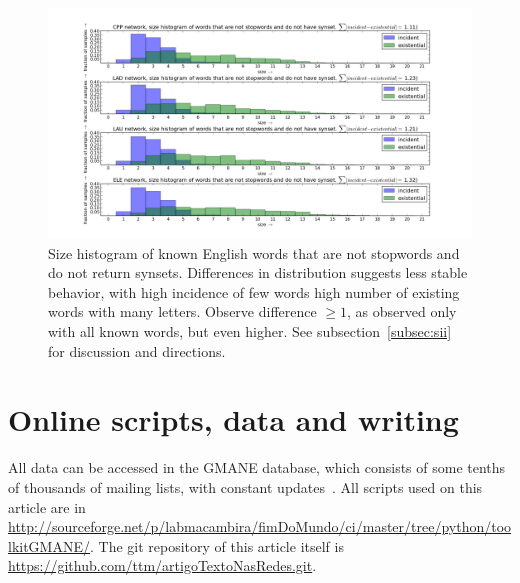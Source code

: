 \documentclass[%
 aip,
 jmp,%
 amsmath,amssymb,
 reprint,%
]{revtex4-1}
\begin{document}
\begin{figure}[h!]
    \centering
    \includegraphics[width=\textwidth]{figs/nssnsw}
    \caption{Size histogram of known English words that are not stopwords and do not return synsets. Differences in distribution suggests less stable behavior, with high incidence of few words high number of existing words with many letters. Observe difference $\geq 1$, as observed only with all known words, but even higher. See subsection~\ref{subsec:sii} for discussion and directions.}
    \label{fig:nssnsw}
\end{figure}


\clearpage
\section{Online scripts, data and writing}\label{sec:on}
All data can be accessed in the GMANE database, which consists of some tenths of thousands of mailing lists, with constant updates~\cite{GMANE}. All scripts used on this article are in \url{http://sourceforge.net/p/labmacambira/fimDoMundo/ci/master/tree/python/toolkitGMANE/}. The git repository of this article itself is \url{https://github.com/ttm/artigoTextoNasRedes.git}.




\end{document}
